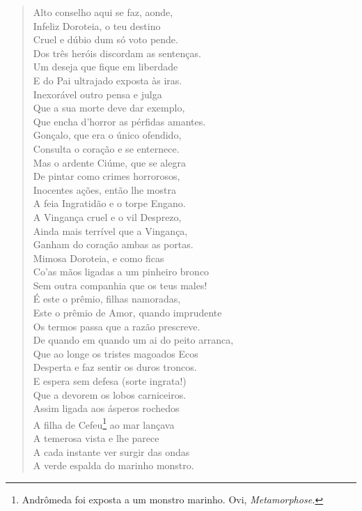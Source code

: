 \begin{verse}

Alto conselho aqui se faz, aonde,\\
Infeliz Doroteia, o teu destino\\
Cruel e dúbio dum só voto pende.\\
Dos três heróis discordam as sentenças.\\
Um deseja que fique em liberdade\\
E do Pai ultrajado exposta às iras.\\
Inexorável outro pensa e julga\\
Que a sua morte deve dar exemplo,\\
Que encha d'horror as pérfidas amantes.\\
Gonçalo, que era o único ofendido,\\
Consulta o coração e se enternece.\\
Mas o ardente Ciúme, que se alegra\\
De pintar como crimes horrorosos,\\
Inocentes ações, então lhe mostra\\
A feia Ingratidão e o torpe Engano.\\
A Vingança cruel e o vil Desprezo,\\
Ainda mais terrível que a Vingança,\\
Ganham do coração ambas as portas.\\
Mimosa Doroteia, e como ficas\\
Co'as mãos ligadas a um pinheiro bronco\\
Sem outra companhia que os teus males!\\
É este o prêmio, filhas namoradas,\\
Este o prêmio de Amor, quando imprudente\\		\index{\Amor}
Os termos passa que a razão prescreve.\\
De quando em quando um ai do peito arranca,\\
Que ao longe os tristes magoados Ecos\\
Desperta e faz sentir os duros troncos.\\
E espera sem defesa (sorte ingrata!)\\
Que a devorem os lobos carniceiros.\\
Assim ligada aos ásperos rochedos\\
A filha de Cefeu\footnote{ Andrômeda foi exposta a um monstro marinho.
Ovi, \textit{Metamorphose.}} ao mar lançava\\
A temerosa vista e lhe parece\\
A cada instante ver surgir das ondas\\
A verde espalda do marinho monstro. \\[10pt]



\end{verse}
